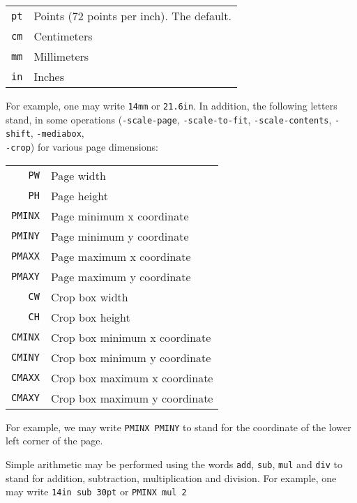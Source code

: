 \documentclass{book}
\begin{document}
\begin{table}[h]
\centering
\begin{tabular}{rl}
  \texttt{pt} & Points (72 points per inch). The default. \\
  \texttt{cm} & Centimeters \\
  \texttt{mm} & Millimeters \\
  \texttt{in} & Inches \\
\end{tabular}
\end{table}

\noindent For example, one may write \texttt{14mm} or \texttt{21.6in}. In addition, the following letters stand, in some operations (\texttt{-scale-page}, \texttt{-scale-to-fit}, \texttt{-scale-contents}, \texttt{-shift}, \texttt{-mediabox},\\ \texttt{-crop}) for various page dimensions:

\begin{table}[h]
\centering
\begin{tabular}{rl}
  \texttt{PW} & Page width\\
  \texttt{PH} & Page height\\
  \texttt{PMINX} & Page minimum x coordinate\\
  \texttt{PMINY} & Page minimum y coordinate\\
  \texttt{PMAXX} & Page maximum x coordinate\\
  \texttt{PMAXY} & Page maximum y coordinate\\
  \texttt{CW} & Crop box width\\
  \texttt{CH} & Crop box height\\
  \texttt{CMINX} & Crop box minimum x coordinate\\
  \texttt{CMINY} & Crop box minimum y coordinate\\
  \texttt{CMAXX} & Crop box maximum x coordinate\\
  \texttt{CMAXY} & Crop box maximum y coordinate
\end{tabular}
\end{table}

\noindent For example, we may write \texttt{PMINX PMINY} to stand for the coordinate of the lower left corner of the page.

Simple arithmetic may be performed using the words \texttt{add}, \texttt{sub}, \texttt{mul} and \texttt{div} to stand for addition, subtraction, multiplication and division. For example, one may write \texttt{14in\hspace{-1mm} sub\hspace{-1mm} 30pt} or \texttt{PMINX\hspace{-1mm} mul\hspace{-1mm} 2}
\end{document}
